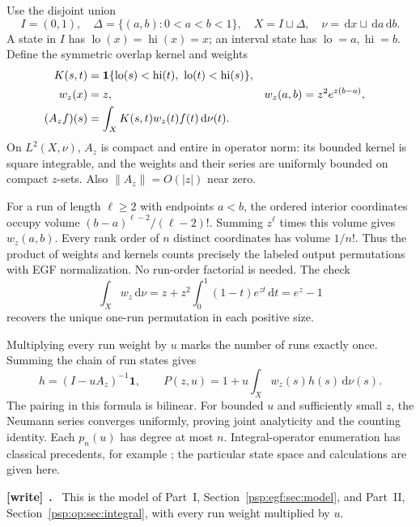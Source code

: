 \documentclass[11pt,letterpaper]{article}
\numberwithin{equation}{section}
\theoremstyle{remark}\newtheorem{remark}[theorem]{Remark}
\newcommand{\dd}{\,\mathrm d}
\newcommand{\one}{\mathbf1}
\newcommand{\lo}{\operatorname{lo}}
\newcommand{\hi}{\operatorname{hi}}
\newenvironment{writenote}[1][]{\par\smallskip\begingroup\small
 \noindent\textbf{[write]}\if\relax\detokenize{#1}\relax\else~\textbf{#1.}\fi\ }%
 {\par\endgroup\smallskip}
\begin{document}
Use the disjoint union
\[
 I=(0,1),\quad \Delta=\{(a,b):0<a<b<1\},\quad
 X=I\sqcup\Delta,\quad \nu=\dd x\sqcup\dd a\dd b.
\]
A state in $I$ has $\lo(x)=\hi(x)=x$; an interval state has $\lo=a,\hi=b$.
Define the symmetric overlap kernel and weights
\begin{align}
 K(s,t)&=\one\{\lo(s)<\hi(t),\ \lo(t)<\hi(s)\},\notag\\
 w_z(x)&=z,& w_z(a,b)&=z^2e^{z(b-a)},\label{psp:run:eq:weight}\\
 (A_zf)(s)&=\int_X K(s,t)w_z(t)f(t)\dd\nu(t).\label{psp:run:eq:Az}
\end{align}
On $L^2(X,\nu)$, $A_z$ is compact and entire in operator norm: its
bounded kernel is square integrable, and the weights and their series
are uniformly bounded on compact $z$-sets. Also $\|A_z\|=O(|z|)$ near zero.

For a run of length $\ell\geq2$ with endpoints $a<b$, the ordered
interior coordinates occupy volume $(b-a)^{\ell-2}/(\ell-2)!$.
Summing $z^\ell$ times this volume gives $w_z(a,b)$. Every rank order of
$n$ distinct coordinates has volume $1/n!$. Thus the product of weights
and kernels counts precisely the labeled output permutations with EGF
normalization. No run-order factorial is needed. The check
\[
 \int_Xw_z\dd\nu=z+z^2\int_0^1(1-t)e^{zt}\dd t=e^z-1
\]
recovers the unique one-run permutation in each positive size.

Multiplying every run weight by $u$ marks the number of runs exactly
once. Summing the chain of run states gives
\begin{equation}\label{psp:run:eq:resolvent}
 h=(I-uA_z)^{-1}\one,\qquad
 P(z,u)=1+u\int_Xw_z(s)h(s)\dd\nu(s).
\end{equation}
The pairing in this formula is bilinear. For bounded $u$ and sufficiently
small $z$, the Neumann series converges uniformly, proving joint
analyticity and the counting identity. Each $p_n(u)$ has degree at most
$n$. Integral-operator enumeration has classical precedents, for example
\cite{ekp}; the particular state space and calculations are given here.
\begin{writenote}
This is the model of Part~I, Section~\ref{psp:egf:sec:model}, and Part~II, Section~\ref{psp:op:sec:integral}, with every run weight multiplied by $u$.
\end{writenote}
\end{document}

